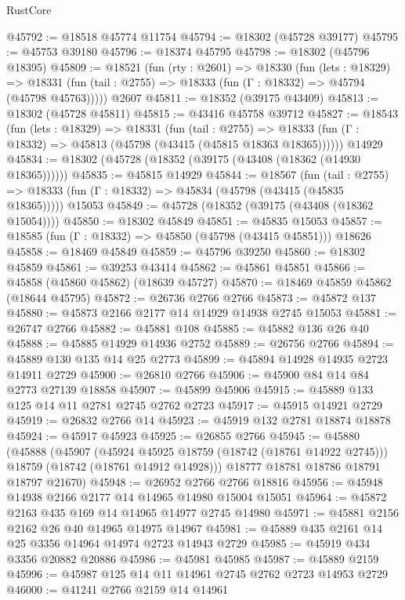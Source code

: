 \begin{lexlean}{RustCore}
\begin{coremodule}
@45792 := @18518 @45774 @11754
@45794 := @18302 (@45728 @39177)
@45795 := @45753 @39180
@45796 := @18374 @45795
@45798 := @18302 (@45796 @18395)
@45809 := @18521
    (fun (rty : @2601) =>
    @18330
      (fun (lets : @18329) =>
      @18331 (fun (tail : @2755) => @18333 (fun (Γ : @18332) => @45794 (@45798 @45763)))))
    @2607
@45811 := @18352 (@39175 @43409)
@45813 := @18302 (@45728 @45811)
@45815 := @43416 @45758 @39712
@45827 := @18543
    (fun (lets : @18329) =>
    @18331
      (fun (tail : @2755) =>
      @18333 (fun (Γ : @18332) => @45813 (@45798 (@43415 (@45815 @18363 @18365))))))
    @14929
@45834 := @18302 (@45728 (@18352 (@39175 (@43408 (@18362 (@14930 @18365))))))
@45835 := @45815 @14929
@45844 := @18567
    (fun (tail : @2755) => @18333 (fun (Γ : @18332) => @45834 (@45798 (@43415 (@45835 @18365)))))
    @15053
@45849 := @45728 (@18352 (@39175 (@43408 (@18362 @15054))))
@45850 := @18302 @45849
@45851 := @45835 @15053
@45857 := @18585 (fun (Γ : @18332) => @45850 (@45798 (@43415 @45851))) @18626
@45858 := @18469 @45849
@45859 := @45796 @39250
@45860 := @18302 @45859
@45861 := @39253 @43414
@45862 := @45861 @45851
@45866 := @45858 (@45860 @45862) (@18639 @45727)
@45870 := @18469 @45859 @45862 (@18644 @45795)
@45872 := @26736 @2766 @2766
@45873 := @45872 @137
@45880 := @45873 @2166 @2177 @14 @14929 @14938 @2745 @15053
@45881 := @26747 @2766
@45882 := @45881 @108
@45885 := @45882 @136 @26 @40
@45888 := @45885 @14929 @14936 @2752
@45889 := @26756 @2766
@45894 := @45889 @130 @135 @14 @25 @2773
@45899 := @45894 @14928 @14935 @2723 @14911 @2729
@45900 := @26810 @2766
@45906 := @45900 @84 @14 @84 @2773 @27139 @18858
@45907 := @45899 @45906
@45915 := @45889 @133 @125 @14 @11 @2781 @2745 @2762 @2723
@45917 := @45915 @14921 @2729
@45919 := @26832 @2766 @14
@45923 := @45919 @132 @2781 @18874 @18878
@45924 := @45917 @45923
@45925 := @26855 @2766
@45945 := @45880
    (@45888
      (@45907
        (@45924 @45925 @18759 (@18742 (@18761 @14922 @2745)))
        @18759
        (@18742 (@18761 @14912 @14928)))
      @18777
      @18781
      @18786
      @18791
      @18797
      @21670)
@45948 := @26952 @2766 @2766 @18816
@45956 := @45948 @14938 @2166 @2177 @14 @14965 @14980 @15004 @15051
@45964 := @45872 @2163 @435 @169 @14 @14965 @14977 @2745 @14980
@45971 := @45881 @2156 @2162 @26 @40 @14965 @14975 @14967
@45981 := @45889 @435 @2161 @14 @25 @3356 @14964 @14974 @2723 @14943 @2729
@45985 := @45919 @434 @3356 @20882 @20886
@45986 := @45981 @45985
@45987 := @45889 @2159
@45996 := @45987 @125 @14 @11 @14961 @2745 @2762 @2723 @14953 @2729
@46000 := @41241 @2766 @2159 @14 @14961

\end{coremodule}
\end{lexlean}
